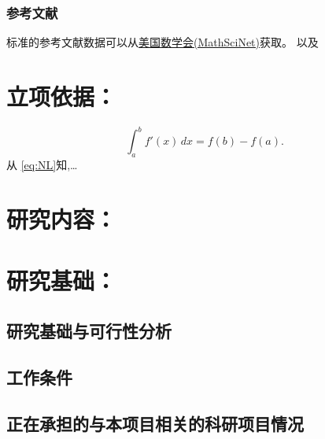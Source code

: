 \documentclass[UTF8,zihao=-4]{ctexart} %
\begin{document}
   \subsubsection{参考文献}
   标准的参考文献数据可以从\href{https://mathscinet.ams.org/mrlookup}{美国数学会(MathSciNet)}获取。
   \cite{EinsteinBergmann1938AM}以及
   \cites{EinsteinBergmann1938AM,Hamilton1982JDG,Osserman1990AMM}
   \section[（为什么要开展此项研究，研究的科学技术价值如何）]{立项依据：}
   \zhlipsum[3-4]
   \begin{equation}\label{eq:NL}
     \int_a^b f'(x)\,dx=f(b)-f(a).
   \end{equation}
  从 \eqref{eq:NL}知,\ldots
  \nocite{*}%

   \section[（提纲不做限制，请按照研究工作的自身逻辑撰写。应提炼出特色与创新点、年度研究计划）]{研究内容：}
   \zhlipsum[5-6]
   \section{研究基础：}

   \subsection[（与本项目相关的研究工作积累和已取得的研究工作成绩，研究风险的应对措施等）；]{研究基础与可行性分析}
   \zhlipsum[7-8]

   \subsection[（包括已具备的实验条件，尚缺少的实验条件和拟解决的途径，包括利用国家实验室、全国重点实验室和部门重点实验室等研究基地的计划与落实情况）；]{工作条件}
   \zhlipsum[9-15]
   \subsection[（申请人和主要参与者正在承担的与本项目相关的科研项目情况，包括国家自然科学基金的项目和国家其他科技计划项目，要注明项目的资助机构、项目类别、批准号、项目名称、获资助金额、起止年月、与本项目的关系及负责的内容等）；]{正在承担的与本项目相关的科研项目情况}
\end{document}
